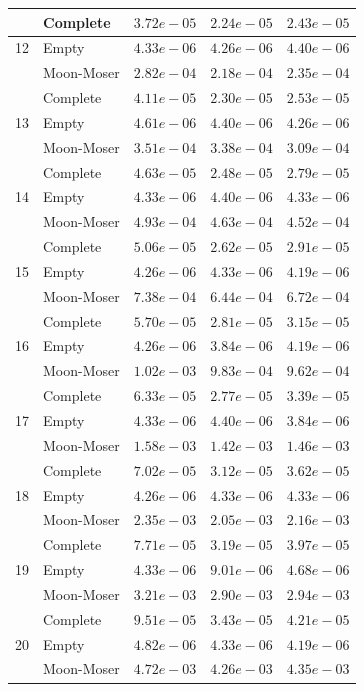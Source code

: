 \documentclass[12pt,a4paper]{article}
\begin{document}
\begin{longtable}{|l||l|l|l|l|}
  & Complete & $3.72e-05$ & $2.24e-05$ & $2.43e-05$ \\
  \hline
  12 & Empty & $4.33e-06$ & $4.26e-06$ & $4.40e-06$ \\
  & Moon-Moser & $2.82e-04$ & $2.18e-04$ & $2.35e-04$ \\
  & Complete & $4.11e-05$ & $2.30e-05$ & $2.53e-05$ \\
  \hline
  13 & Empty & $4.61e-06$ & $4.40e-06$ & $4.26e-06$ \\
  & Moon-Moser & $3.51e-04$ & $3.38e-04$ & $3.09e-04$ \\
  & Complete & $4.63e-05$ & $2.48e-05$ & $2.79e-05$ \\
  \hline
  14 & Empty & $4.33e-06$ & $4.40e-06$ & $4.33e-06$ \\
  & Moon-Moser & $4.93e-04$ & $4.63e-04$ & $4.52e-04$ \\
  & Complete & $5.06e-05$ & $2.62e-05$ & $2.91e-05$ \\
  \hline
  15 & Empty & $4.26e-06$ & $4.33e-06$ & $4.19e-06$ \\
  & Moon-Moser & $7.38e-04$ & $6.44e-04$ & $6.72e-04$ \\
  & Complete & $5.70e-05$ & $2.81e-05$ & $3.15e-05$ \\
  \hline
  16 & Empty & $4.26e-06$ & $3.84e-06$ & $4.19e-06$ \\
  & Moon-Moser & $1.02e-03$ & $9.83e-04$ & $9.62e-04$ \\
  & Complete & $6.33e-05$ & $2.77e-05$ & $3.39e-05$ \\
  \hline
  17 & Empty & $4.33e-06$ & $4.40e-06$ & $3.84e-06$ \\
  & Moon-Moser & $1.58e-03$ & $1.42e-03$ & $1.46e-03$ \\
  & Complete & $7.02e-05$ & $3.12e-05$ & $3.62e-05$ \\
  \hline
  18 & Empty & $4.26e-06$ & $4.33e-06$ & $4.33e-06$ \\
  & Moon-Moser & $2.35e-03$ & $2.05e-03$ & $2.16e-03$ \\
  & Complete & $7.71e-05$ & $3.19e-05$ & $3.97e-05$ \\
  \hline
  19 & Empty & $4.33e-06$ & $9.01e-06$ & $4.68e-06$ \\
  & Moon-Moser & $3.21e-03$ & $2.90e-03$ & $2.94e-03$ \\
  & Complete & $9.51e-05$ & $3.43e-05$ & $4.21e-05$ \\
  \hline
  20 & Empty & $4.82e-06$ & $4.33e-06$ & $4.19e-06$ \\
  & Moon-Moser & $4.72e-03$ & $4.26e-03$ & $4.35e-03$ \\

\end{longtable}
\end{document}
